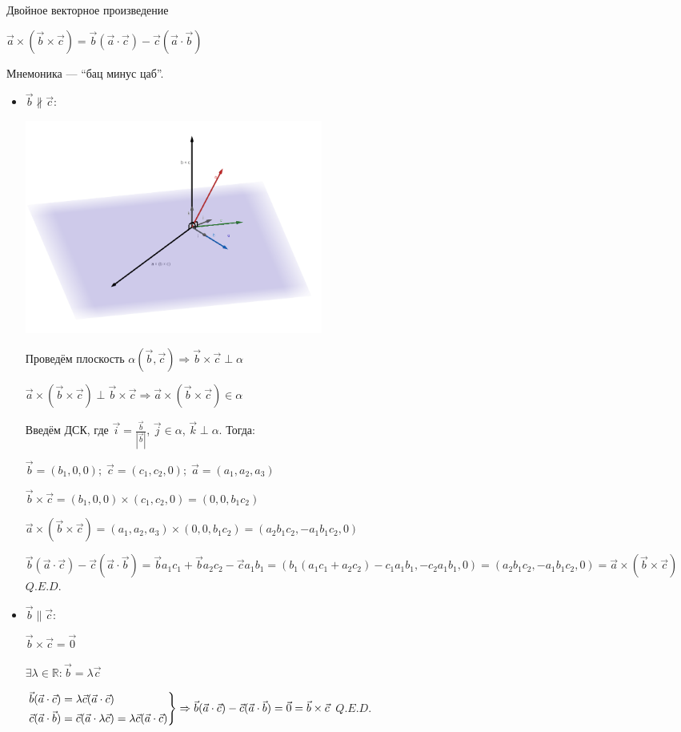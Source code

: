 \documentclass[twoside]{book}
\begin{document}
Двойное векторное произведение

\(\vec a \times (\vec b \times \vec c) = \vec b(\vec a \cdot \vec c) - \vec c(\vec a \cdot \vec b)\)

Мнемоника --- ``бац минус цаб''.

\begin{itemize}
    \item \(\vec b \nparallel \vec c\):
          \begin{center}
              \includegraphics[height=7cm]{Images/Chapter_1/1-7-1.png}
          \end{center}
          Проведём плоскость \(\alpha(\vec b, \vec c) \Rightarrow \vec b \times \vec c \perp \alpha\)

          \(\vec a \times (\vec b \times \vec c) \perp \vec b \times \vec c \Rightarrow \vec a \times (\vec b \times \vec c) \in \alpha\)

          Введём ДСК, где \(\vec i = \frac{\vec b}{|\vec b|}\), \(\vec j \in \alpha\), \(\vec k \perp \alpha\). Тогда:

          \(\vec b = (b_1, 0, 0);\; \vec c = (c_1, c_2, 0);\; \vec a = (a_1, a_2, a_3)\)

          \(\vec b \times \vec c = (b_1, 0, 0) \times (c_1, c_2, 0) = (0, 0, b_1 c_2)\)

          \(\vec a \times (\vec b \times \vec c) = (a_1, a_2, a_3) \times (0, 0, b_1 c_2) = (a_2 b_1 c_2, -a_1 b_1 c_2, 0)\)

          \(\vec b(\vec a \cdot \vec c) - \vec c(\vec a \cdot \vec b) = \vec b a_1 c_1 + \vec b a_2 c_2 - \vec c a_1 b_1 =
          (b_1(a_1 c_1 + a_2 c_2) - c_1 a_1 b_1, -c_2 a_1 b_1, 0) =
          (a_2 b_1 c_2, -a_1 b_1 c_2, 0) = \vec a \times (\vec b \times \vec c)\) \(Q.E.D.\)
    \item \(\vec b \parallel \vec c\):

          \(\vec b \times \vec c = \vec 0\)

          \(\exists \lambda \in \mathbb{R}: \vec b = \lambda \vec c\)

          \(\begin{rcases}
              \vec b(\vec a \cdot \vec c) = \lambda \vec c(\vec a \cdot \vec c) \\
              \vec c(\vec a \cdot \vec b) = \vec c(\vec a \cdot \lambda\vec c) = \lambda \vec c(\vec a \cdot \vec c)
          \end{rcases} \Rightarrow \vec b(\vec a \cdot \vec c) - \vec c(\vec a \cdot \vec b) = \vec 0 = \vec b \times \vec c\) \(Q.E.D.\)
\end{itemize}
\end{document}
